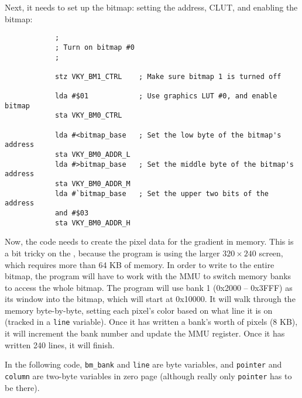 Next, it needs to set up the bitmap: setting the address, CLUT, and enabling the bitmap:

\begin{verbatim}
            ;
            ; Turn on bitmap #0
            ;

            stz VKY_BM1_CTRL    ; Make sure bitmap 1 is turned off

            lda #$01            ; Use graphics LUT #0, and enable bitmap
            sta VKY_BM0_CTRL

            lda #<bitmap_base   ; Set the low byte of the bitmap's address
            sta VKY_BM0_ADDR_L
            lda #>bitmap_base   ; Set the middle byte of the bitmap's address
            sta VKY_BM0_ADDR_M
            lda #`bitmap_base   ; Set the upper two bits of the address
            and #$03
            sta VKY_BM0_ADDR_H
\end{verbatim}

Now, the code needs to create the pixel data for the gradient in memory. This is a bit tricky on the \jr, because the program is using the larger $320 \times 240$ screen, which requires more than 64 KB of memory. In order to write to the entire bitmap, the program will have to work with the MMU to switch memory banks to access the whole bitmap. The program will use bank 1 (0x2000 -- 0x3FFF) as its window into the bitmap, which will start at 0x10000. It will walk through the memory byte-by-byte, setting each pixel's color based on what line it is on (tracked in a \verb+line+ variable). Once it has written a bank's worth of pixels (8 KB), it will increment the bank number and update the MMU register. Once it has written 240 lines, it will finish.

In the following code, \verb+bm_bank+ and \verb+line+ are byte variables, and \verb+pointer+ and \verb+column+ are two-byte variables in zero page (although really only \verb+pointer+ has to be there).

